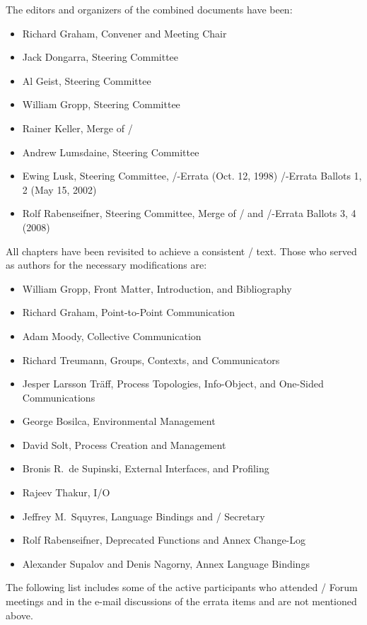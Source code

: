 The editors and organizers of the combined documents have been:
\begin{itemize} 
\item Richard Graham, Convener and Meeting Chair
\item Jack Dongarra, Steering Committee
\item Al Geist, Steering Committee 
\item William Gropp, Steering Committee 
\item Rainer Keller, Merge of \MPIIDOTIII/
\item Andrew Lumsdaine, Steering Committee
\item Ewing Lusk, Steering Committee, \MPIIDOTI/-Errata (Oct. 12, 1998) \MPIIIDOTI/-Errata Ballots 1, 2 (May 15, 2002)
\item Rolf Rabenseifner, Steering Committee, Merge of \MPIIIDOTI/ and \MPIIIDOTI/-Errata Ballots 3, 4 (2008)
\end{itemize} 

All chapters have been revisited to achieve a consistent \MPIIIDOTI/ text.
Those who served as authors for the necessary modifications are:
\begin{itemize} 
\item William Gropp, Front Matter, Introduction, and Bibliography 
\item Richard Graham, Point-to-Point Communication
\item Adam Moody, Collective Communication
\item Richard Treumann, Groups, Contexts, and Communicators
\item Jesper Larsson Tr\"aff, Process Topologies, 
      Info-Object,
      and One-Sided Communications
\item George Bosilca, Environmental Management
\item David Solt, Process Creation and Management
\item Bronis R.~de Supinski, External Interfaces, and Profiling
\item Rajeev Thakur, I/O
\item Jeffrey M.~Squyres, Language Bindings and \MPIIIDOTI/ Secretary
\item Rolf Rabenseifner, Deprecated Functions and Annex Change-Log 
\item Alexander Supalov and Denis Nagorny, Annex Language
Bindings
\end{itemize} 

The following list includes some of the active participants who
attended \MPIII/ Forum meetings and in the e-mail discussions
of the errata items and are not mentioned above.
 
